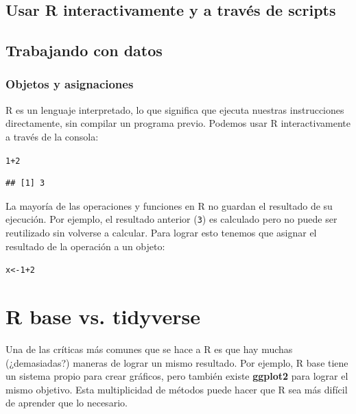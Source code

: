 \documentclass[12pt]{report}\usepackage[]{graphicx}\usepackage[]{color}
\makeatletter
\newcommand{\hlnum}[1]{\textcolor[rgb]{0.686,0.059,0.569}{#1}}%
\newcommand{\hlopt}[1]{\textcolor[rgb]{0,0,0}{#1}}%
\newcommand{\hlstd}[1]{\textcolor[rgb]{0.345,0.345,0.345}{#1}}%
\newcommand{\hlkwb}[1]{\textcolor[rgb]{0.69,0.353,0.396}{#1}}%
\newenvironment{kframe}{%
 \def\at@end@of@kframe{}%
 \ifinner\ifhmode%
  \def\at@end@of@kframe{\end{minipage}}%
  \begin{minipage}{\columnwidth}%
 \fi\fi%
 \def\FrameCommand##1{\hskip\@totalleftmargin \hskip-\fboxsep
 \colorbox{shadecolor}{##1}\hskip-\fboxsep
     \hskip-\linewidth \hskip-\@totalleftmargin \hskip\columnwidth}%
 \MakeFramed {\advance\hsize-\width
   \@totalleftmargin\z@ \linewidth\hsize
   \@setminipage}}%
 {\par\unskip\endMakeFramed%
 \at@end@of@kframe}
\newenvironment{knitrout}{}{} %
\newcommand*{\paq}[1]{\textbf{#1}\index{#1@\textbf{#1}}}
\makeatother
\begin{document}
\subsection{Usar R interactivamente y a través de scripts}

\subsection{Trabajando con datos}

\subsubsection{Objetos y asignaciones}

R es un lenguaje interpretado, lo que significa que ejecuta nuestras instrucciones directamente, sin compilar un programa previo. Podemos usar R interactivamente a través de la consola:
\begin{knitrout}
\color{fgcolor}\begin{kframe}
\begin{alltt}
\hlnum{1}\hlopt{+}\hlnum{2}
\end{alltt}
\begin{verbatim}
## [1] 3
\end{verbatim}
\end{kframe}
\end{knitrout}

La mayoría de las operaciones y funciones en R no guardan el resultado de su ejecución. Por ejemplo, el resultado anterior (\verb|3|) es calculado pero no puede ser reutilizado sin volverse a calcular. Para lograr esto tenemos que asignar el resultado de la operación a un objeto:
\begin{knitrout}
\color{fgcolor}\begin{kframe}
\begin{alltt}
\hlstd{x} \hlkwb{<-} \hlnum{1}\hlopt{+}\hlnum{2}
\end{alltt}
\end{kframe}
\end{knitrout}

\section{R base vs. tidyverse}

Una de las críticas más comunes que se hace a R es que hay muchas (¿demasiadas?) maneras de lograr un mismo resultado. Por ejemplo, R base tiene un sistema propio para crear gráficos, pero también existe \paq{ggplot2} para lograr el mismo objetivo.
Esta multiplicidad de métodos puede hacer que R sea más difícil de aprender que lo necesario.
\end{document}
